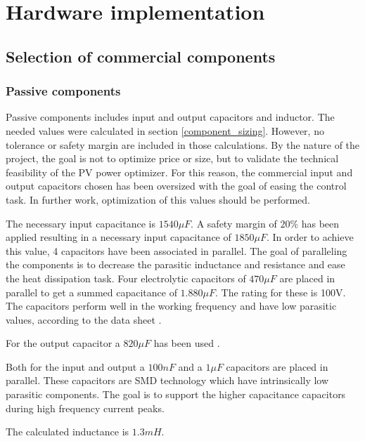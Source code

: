 
\chapter{Hardware implementation} \label{ch:hardware_implementation}


\section{Selection of commercial components}

\subsection{Passive components}

Passive components includes input and output capacitors and inductor. The needed values were calculated in section \ref{component_sizing}. However, no tolerance or safety margin are included in those calculations. By the nature of the project, the goal is not to optimize price or size, but to validate the technical feasibility of the PV power optimizer. For this reason, the commercial input and output capacitors chosen has been oversized with the goal of easing the control task. In further work, optimization of this values should be performed.

The necessary input capacitance is $1540 \mu F$. A safety margin of $20 \%$ has been applied resulting in a necessary input capacitance of $1850 \mu F$. In order to achieve this value, 4 capacitors have been associated in parallel. The goal of paralleling the components is to decrease the parasitic inductance and resistance and ease the heat dissipation task. Four electrolytic capacitors of $470\mu F$ \cite{cin} are placed in parallel to get a summed capacitance of $1.880\mu F$. The rating for these is 100V. The capacitors perform well in the working frequency and have low parasitic values, according to the data sheet \cite{cin}.

For the output capacitor a $820\mu F$ has been used \cite{cout}. 

Both for the input and output a $100nF$ and a $1\mu F$ capacitors are placed in parallel. These capacitors are SMD technology which have intrinsically low parasitic components. The goal is to support the higher capacitance capacitors during high frequency current peaks.

The calculated inductance is $1.3 mH$. 


